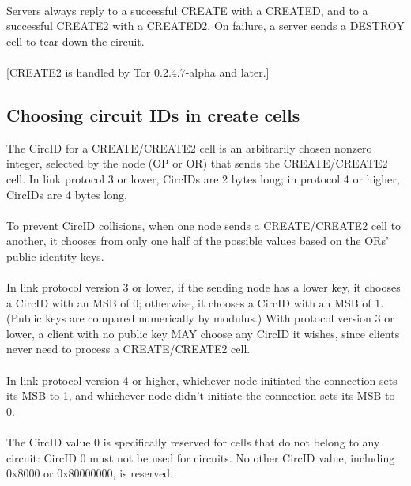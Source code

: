 \paragraph{}
Servers always reply to a successful CREATE with a CREATED, and to a
successful CREATE2 with a CREATED2. On failure, a server sends a
DESTROY cell to tear down the circuit.

\paragraph{}
[CREATE2 is handled by Tor 0.2.4.7-alpha and later.]

\subsection{Choosing circuit IDs in create cells}
The CircID for a CREATE/CREATE2 cell is an arbitrarily chosen
nonzero integer, selected by the node (OP or OR) that sends the
CREATE/CREATE2 cell. In link protocol 3 or lower, CircIDs are 2
bytes long; in protocol 4 or higher, CircIDs are 4 bytes long.

\paragraph{}
To prevent CircID collisions, when one node sends a CREATE/CREATE2
cell to another, it chooses from only one half of the possible
values based on the ORs' public identity keys.

\paragraph{}
In link protocol version 3 or lower, if the sending node has a lower
key, it chooses a CircID with an MSB of 0; otherwise, it chooses a
CircID with an MSB of 1. (Public keys are compared numerically by
modulus.) With protocol version 3 or lower, a client with no public key
MAY choose any CircID it wishes, since clients never need to process a
CREATE/CREATE2 cell.

\paragraph{}
In link protocol version 4 or higher, whichever node initiated the
connection sets its MSB to 1, and whichever node didn't initiate the
connection sets its MSB to 0.

\paragraph{}
The CircID value 0 is specifically reserved for cells that do not
belong to any circuit: CircID 0 must not be used for circuits. No
other CircID value, including 0x8000 or 0x80000000, is reserved.

